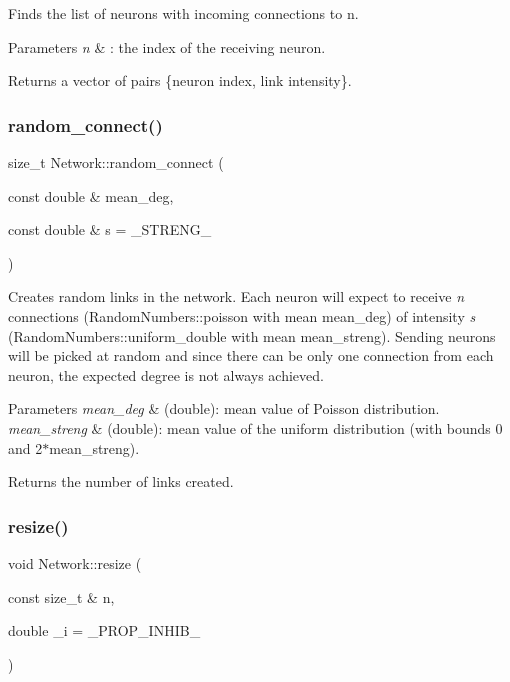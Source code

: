 Finds the list of neurons with incoming connections to {\ttfamily n}. 
\begin{DoxyParams}{Parameters}
{\em n} & \+: the index of the receiving neuron. \\
\hline
\end{DoxyParams}
\begin{DoxyReturn}{Returns}
a vector of pairs \{neuron index, link intensity\}. 
\end{DoxyReturn}
\mbox{\label{classNetwork_a4c751a78c7bc5e27c6b36df78c9c70c0}} 
\subsubsection{\texorpdfstring{random\+\_\+connect()}{random\_connect()}}
{\footnotesize\ttfamily size\+\_\+t Network\+::random\+\_\+connect (\begin{DoxyParamCaption}\item[{const double \&}]{mean\+\_\+deg,  }\item[{const double \&}]{s = {\ttfamily \+\_\+STRENG\+\_\+} }\end{DoxyParamCaption})}

Creates random links in the network. Each neuron will expect to receive {\itshape n} connections (Random\+Numbers\+::poisson with mean {\ttfamily mean\+\_\+deg}) of intensity {\itshape s} (Random\+Numbers\+::uniform\+\_\+double with mean {\ttfamily mean\+\_\+streng}). Sending neurons will be picked at random and since there can be only one connection from each neuron, the expected degree is not always achieved. 
\begin{DoxyParams}{Parameters}
{\em mean\+\_\+deg} & (double)\+: mean value of Poisson distribution. \\
\hline
{\em mean\+\_\+streng} & (double)\+: mean value of the uniform distribution (with bounds 0 and 2$\ast$mean\+\_\+streng). \\
\hline
\end{DoxyParams}
\begin{DoxyReturn}{Returns}
the number of links created. 
\end{DoxyReturn}
\mbox{\label{classNetwork_ae9d6a1913ae92e1d2d7cd17f70f815b5}} 
\subsubsection{\texorpdfstring{resize()}{resize()}}
{\footnotesize\ttfamily void Network\+::resize (\begin{DoxyParamCaption}\item[{const size\+\_\+t \&}]{n,  }\item[{double}]{\+\_\+i = {\ttfamily \+\_\+PROP\+\_\+INHIB\+\_\+} }\end{DoxyParamCaption})}

